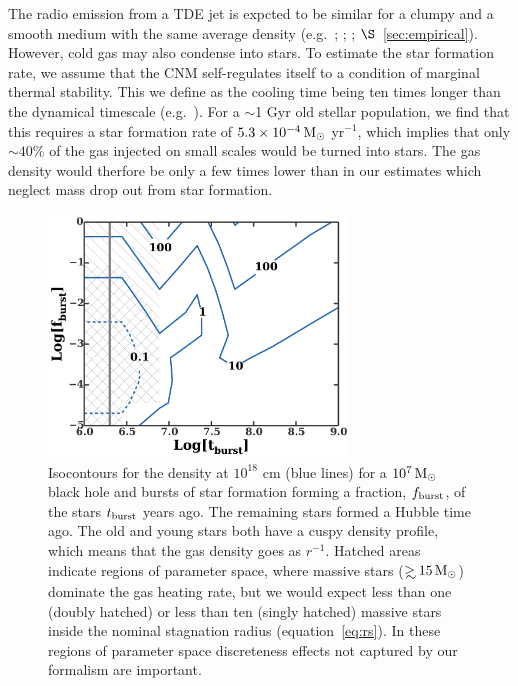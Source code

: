 \documentclass[usenatbib,fleqn]{mnras}
\newcommand\gsim{\mathrel{\rlap{\lower4pt\hbox{\hskip1pt$\sim$}}
    \raise1pt\hbox{$>$}}}
\newcommand{\Msun}{{\rm M_\odot}}
\begin{document}
The radio emission from a TDE jet is expcted to be similar for a clumpy and a smooth medium with the same
average density (e.g.~\citealt{Nakar&Granot07}; \citealt{Mimica&Giannios09}; \citealt{vanEerten+09}; $\S$~\ref{sec:empirical}).  However, cold gas may also condense into stars.  To estimate the star formation rate, we assume that the CNM self-regulates itself to a condition of marginal thermal stability.  This we define as the cooling time being ten times longer than the dynamical timescale (e.g.~\citealt{McCourt+09}). For a $\sim$1 Gyr old stellar population, we find that this requires a star formation rate of  $5.3 \times 10^{-4} \,\Msun$ yr$^{-1}$, which implies that only $\sim 40$\% of the gas injected on small scales would be turned into stars.  The gas density would therfore be only a few times lower than in our estimates which neglect mass drop out from star formation.

\begin{figure} 
  \includegraphics[width=8cm]{cnm_plot.pdf}
  \caption{\label{fig:param} Isocontours for the density at $10^{18}$
    cm (blue lines) for a $10^{7} \, \Msun$ black hole and bursts of
    star formation forming a fraction, $f_{\rm burst}$, of the stars
    $t_{\rm burst}$ years ago. The remaining stars formed a Hubble
    time ago. The old and young stars both have a cuspy density
    profile, which means that the gas density goes as $r^{-1}$.
    Hatched areas indicate regions of parameter space, where massive
    stars ($\gsim 15 \, \Msun$) dominate the gas heating rate, but we
    would expect less than one (doubly hatched) or less than ten
    (singly hatched) massive stars inside the nominal stagnation
    radius (equation~\ref{eq:rs}). In these regions of parameter space
    discreteness effects not captured by our formalism are important.}
\end{figure}


\end{document}
